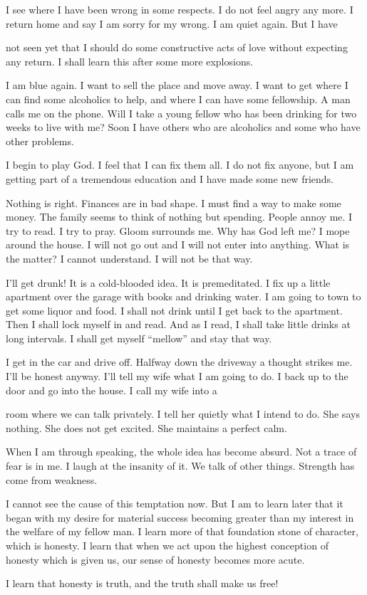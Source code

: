 I see where I have been wrong in some respects. I do not feel angry any more. I return home and say I am sorry for my wrong. I am quiet again. But I have

not seen yet that I should do some constructive acts of love without expecting any return. I shall learn this after some more explosions.

I am blue again. I want to sell the place and move away. I want to get where I can find some alcoholics to help, and where I can have some fellowship. A man calls me on the phone. Will I take a young fellow who has been drinking for two weeks to live with me? Soon I have others who are alcoholics and some who have other problems.

I begin to play God. I feel that I can fix them all. I do not fix anyone, but I am getting part of a tremendous education and I have made some new friends.

Nothing is right. Finances are in bad shape. I must find a way to make some money. The family seems to think of nothing but spending. People annoy me. I try to read. I try to pray. Gloom surrounds me. Why has God left me? I mope around the house. I will not go out and I will not enter into anything. What is the matter? I cannot understand. I will not be that way.

I’ll get drunk! It is a cold-blooded idea. It is premeditated. I fix up a little apartment over the garage with books and drinking water. I am going to town to get some liquor and food. I shall not drink until I get back to the apartment. Then I shall lock myself in and read. And as I read, I shall take little drinks at long intervals. I shall get myself “mellow” and stay that way.

I get in the car and drive off. Halfway down the driveway a thought strikes me. I’ll be honest anyway. I’ll tell my wife what I am going to do. I back up to the door and go into the house. I call my wife into a

room where we can talk privately. I tell her quietly what I intend to do. She says nothing. She does not get excited. She maintains a perfect calm.

When I am through speaking, the whole idea has become absurd. Not a trace of fear is in me. I laugh at the insanity of it. We talk of other things. Strength has come from weakness.

I cannot see the cause of this temptation now. But I am to learn later that it began with my desire for material success becoming greater than my interest in the welfare of my fellow man. I learn more of that foundation stone of character, which is honesty. I learn that when we act upon the highest conception of honesty which is given us, our sense of honesty becomes more acute.

I learn that honesty is truth, and the truth shall make us free!


